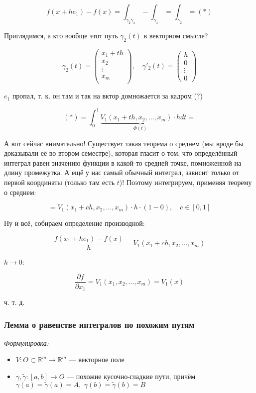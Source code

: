 \documentclass{article}
\def\dbl{\,\,}
\begin{document}
\[f(x + he_1) - f(x) = \int_{\gamma_2\gamma_x} - \int_{\gamma_x} = \int_{\gamma_2} = (*)\]

Приглядимся, а кто вообще этот путь $\gamma_2(t)$ в векторном смысле?

\[\gamma_2(t) = \begin{pmatrix}
    x_1 + th\\
    x_2\\
    \vdots \\
    x_m\\
\end{pmatrix}, \quad \gamma'_2(t) = \begin{pmatrix}
    h\\
    0\\
    \vdots\\
    0
\end{pmatrix}\]

$e_1$ пропал, т. к. он там и так на вктор домножается за кадром (?)

\[(*) = \int_{0}^{1} \underbrace{V_1(x_1 + th, x_2, \ldots, x_m) \cdot h}_{\Phi(t)}dt =\]

А вот сейчас внимательно! Существует такая теорема о среднем (мы вроде бы доказывали её во втором семестре), которая гласит о том, что определённый интеграл равен значению функции в какой-то средней точке, помноженной на длину промежутка. А ещё у нас самый обычный интеграл, зависит только от первой координаты (только там есть $t$)! Поэтому интегрируем, применяя теорему о среднем:

\[ = V_1(x_1 + ch, x_2, \ldots, x_m) \cdot h \cdot (1 - 0), \quad c \in [0, 1]\]

Ну и всё, собираем определение производной:

\[\frac{f(x_1 + he_1) - f(x)}{h} = V_1(x_1 + ch, x_2, \ldots, x_m)\]

$h \rightarrow 0$:

\[\frac{\partial f}{\partial x_1} = V_1(x_1, x_2, \ldots, x_m) = V_1(x)\]

ч. т. д. 

\subsubsection{Лемма о равенстве интегралов по похожим путям}
\textit{Формулировка:}

\begin{itemize}
    \item $V: O \subset \mathbb{R}^m \rightarrow \mathbb{R}^m$ --- векторное поле
    \item $\gamma, \tilde{\gamma}: [a, b] \rightarrow O$ --- похожие кусочно-гладкие пути, причём $\gamma(a) = \tilde{\gamma}(a) = A, \dbl \gamma(b) = \tilde{\gamma}(b) = B$
\end{itemize}
\end{document}
